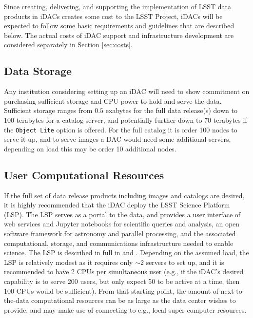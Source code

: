 Since creating, delivering, and supporting the implementation of LSST data products in iDACs creates some cost to the LSST Project, iDACs will be expected to follow some basic requirements and guidelines that are described below. The actual costs of iDAC support and infrastructure development are considered separately in Section \ref{sec:costs}.

\subsection{Data Storage}
Any institution considering setting up an iDAC will need to show commitment on purchasing sufficient storage and CPU power to hold and serve the data. Sufficient storage ranges from $0.5$ exabytes for the full data release(s) down to $100$ terabytes for a catalog server, and potentially further down to $70$ terabytes if the {\tt Object Lite} option is offered. For the full catalog it is order 100 nodes to serve it up, and to serve images a DAC would need some additional servers, depending on load this may be order 10 additional nodes.

\subsection{User Computational Resources}
If the full set of data release products including images and catalogs are desired, it is highly recommended that the iDAC deploy the LSST Science Platform (LSP). The LSP serves as a portal to the data, and provides a user interface of web services and Jupyter notebooks for scientific queries and analysis, an open software framework for astronomy and parallel processing, and the associated computational, storage, and communications infrastructure needed to enable science. The LSP is described in full in  and . Depending on the assumed load, the LSP is relatively modest as it requires only $\sim2$ servers to set up, and it is recommended to have 2 CPUs per simultaneous user (e.g., if the iDAC's desired capability is to serve 200 users, but only expect 50 to be active at a time, then 100 CPUs would be sufficient). From that starting point, the amount of next-to-the-data computational resources can be as large as the data center wishes to provide, and may make use of connecting to e.g., local super computer resources.

